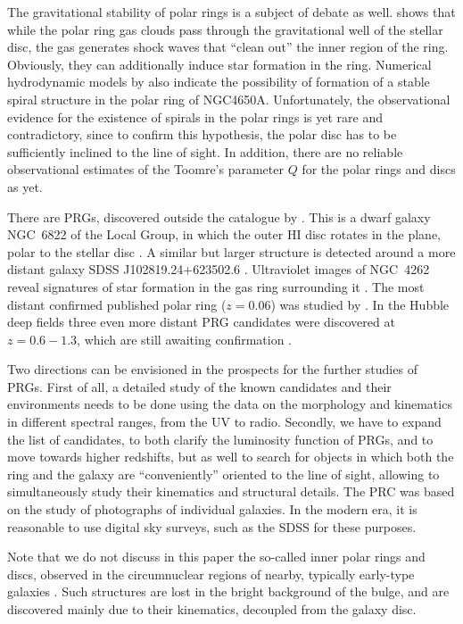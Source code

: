 \documentclass[useAMS,usenatbib]{mn2e}
\begin{document}
The gravitational stability of polar rings is a subject of debate
as well. \citet{Wakamatsu1993} shows that while the
polar ring gas clouds pass through the gravitational well of the stellar disc, the
gas generates shock waves that ``clean out'' the inner region of
the ring. Obviously, they can additionally induce star formation
in the ring. Numerical hydrodynamic models by \citet*{Theis2006}
also indicate the possibility of formation of a stable spiral
structure  in the polar ring of   NGC4650A. Unfortunately, the observational
evidence for the existence of spirals in the polar rings is yet
rare and contradictory, since to confirm this hypothesis, the
polar disc has to be sufficiently inclined to the line of sight.
In addition, there are no reliable observational estimates of the Toomre's
parameter $Q$ for the polar rings and discs as yet.


There are PRGs, discovered outside the catalogue by
\citet{Whitmore1990}.  This is a dwarf galaxy NGC~6822 of the
Local Group, in which the outer HI disc rotates in the plane,
polar to the stellar disc \citep{Demers2006}.   A similar but larger structure
 is detected around a more distant galaxy SDSS J102819.24+623502.6
\citep{Stanonik2009}. Ultraviolet images of  NGC~4262 reveal signatures
of star formation in the gas ring surrounding it  \citep{Bettoni2010}.
The most  distant confirmed published  polar ring ($z=0.06$) was studied by
\citep{Brosch2010}.  In the Hubble deep fields three even more distant
PRG candidates were discovered at  $z=0.6-1.3$, which are still
awaiting confirmation \citep{Resh1997,Resh2007}.


Two directions can be envisioned in the prospects for the  further
studies of PRGs. First of all, a detailed study of the known
candidates and their environments
needs to be done using the data on the morphology and
kinematics in different spectral ranges, from the UV to radio.
Secondly, we have to expand the list of candidates, to both
clarify the luminosity function of PRGs, and to move towards
higher redshifts, but as well to search for objects in which both
the ring and the galaxy are ``conveniently'' oriented to the line
of sight, allowing to simultaneously study their kinematics and
structural details. The PRC was
based on the study of photographs of individual galaxies. In the
modern era, it is reasonable to use digital sky surveys, such as
the SDSS for these purposes.


Note that we do not
 discuss in this paper the so-called inner polar rings and
discs, observed in the circumnuclear regions of nearby, typically
early-type galaxies \citep[see references and discussion in] []
{Corsini2003, SilAfan2004}. Such structures \citep[$\sim30$ of which are
already known, see][]{Moiseev2010} are lost in the bright
background of the bulge, and are discovered mainly due to their
kinematics, decoupled from the  galaxy disc.
\end{document}
